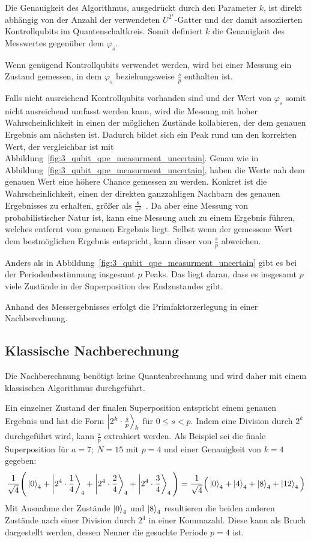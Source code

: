 Die Genauigkeit des Algorithmus, ausgedrückt durch den Parameter \(k\),
ist direkt abhängig von der Anzahl der verwendeten \(U^{2^x}\)-Gatter
und der damit assoziierten Kontrollqubits im Quantenschaltkreis.
Somit definiert \(k\) die Genauigkeit des Messwertes gegenüber dem \(\varphi_s\).

Wenn genügend Kontrollqubits verwendet werden, 
wird bei einer Messung ein Zustand gemessen, 
in dem \(\varphi_s\) beziehungsweise \(\frac{s}{p}\) enthalten ist.

Falls nicht ausreichend Kontrollqubits vorhanden sind 
und der Wert von \(\varphi_s\) somit nicht ausreichend umfasst werden kann,
wird die Messung mit hoher Wahrscheinlichkeit 
in einen der möglichen Zustände kollabieren, 
der dem genauen Ergebnis am nächsten ist.
Dadurch bildet sich ein Peak rund um den korrekten Wert, 
der vergleichbar ist mit Abbildung~\ref{fig:3_qubit_qpe_measurment_uncertain}.
Genau wie in Abbildung~\ref{fig:3_qubit_qpe_measurment_uncertain}, haben die Werte nah dem genauen Wert
eine höhere Chance gemessen zu werden. 
Konkret ist die Wahrscheinlichkeit, 
einen der direkten ganzzahligen Nachbarn des genauen Ergebnisses zu erhalten, 
größer als \(\frac{8}{\pi^2}\)~\cite[119]{kaye2007introduction}.
Da aber eine Messung von probabilistischer Natur ist, 
kann eine Messung auch zu einem Ergebnis führen, 
welches entfernt vom genauen Ergebnis liegt.
Selbst wenn der gemessene Wert dem bestmöglichen Ergebnis entspricht, 
kann dieser von \(\frac{s}{p}\) abweichen. 

Anders als in Abbildung~\ref{fig:3_qubit_qpe_measurment_uncertain} gibt es bei der Periodenbestimmung insgesamt \(p\) Peaks.
Das liegt daran, dass es insgesamt \(p\) viele Zustände in der Superposition des Endzustandes gibt.

Anhand des Messergebnisses erfolgt die Primfaktorzerlegung in einer Nachberechnung.

\subsection{Klassische Nachberechnung} \label{Funktionsweise:klassisch}
Die Nachberechnung benötigt keine Quantenbrechnung und 
wird daher mit einem klassischen Algorithmus durchgeführt.

Ein einzelner Zustand der finalen Superposition 
entspricht einem genauen Ergebnis und hat die Form \(\ket{2^k \cdot \frac{s}{p}}_k\) für \(0 \leq s < p\).
Indem eine Division durch \(2^k\) durchgeführt wird, kann \(\frac{s}{p}\) extrahiert werden.
Als Beispiel sei die finale Superposition für \(a = 7;~N=15\) mit \(p=4\) und einer Genauigkeit von \(k=4\) gegeben:
\[\frac{1}{\sqrt{4}}
\Bigg(\ket{0}_4 +\ket{2^4 \cdot \frac{1}{4}}_4 + \ket{2^4 \cdot \frac{2}{4}}_4+\ket{2^4 \cdot \frac{3}{4}}_4
\Bigg) =
 \frac{1}{\sqrt{4}}
 \Big(\ket{0}_4 +\ket{4}_4 + \ket{8}_4+\ket{12}_4\Big) \]
Mit Ausnahme der Zustände \(\ket{0}_4\) und \(\ket{8}_4\) 
resultieren die beiden anderen Zustände nach einer Division durch \(2^4\) in einer Kommazahl. 
Diese kann als Bruch dargestellt werden, 
dessen Nenner die gesuchte Periode \(p=4\) ist.

